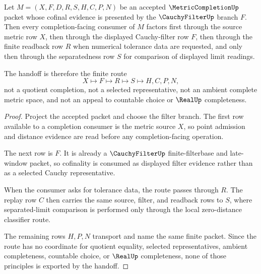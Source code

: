 \begin{theorem}
\label{thm:metric-completion-cauchy-filter-handoff}
Let $M=(X,F,D,R,S,H,C,P,N)$ be an accepted $\MetricCompletionUp$ packet whose cofinal evidence is presented by the $\CauchyFilterUp$ branch $F$. Then every completion-facing consumer of $M$ factors first through the source metric row $X$, then through the displayed Cauchy-filter row $F$, then through the finite readback row $R$ when numerical tolerance data are requested, and only then through the separatedness row $S$ for comparison of displayed limit readings.

The handoff is therefore the finite route
$$
X\longmapsto F\longmapsto R\longmapsto S\longmapsto H,C,P,N ,
$$
not a quotient completion, not a selected representative, not an ambient complete metric space, and not an appeal to countable choice or $\RealUp$ completeness.
\end{theorem}
\begin{proof}
Project the accepted packet and choose the filter branch. The first row available to a completion consumer is the metric source $X$, so point admission and distance evidence are read before any completion-facing operation.

The next row is $F$. It is already a $\CauchyFilterUp$ finite-filterbase and late-window packet, so cofinality is consumed as displayed filter evidence rather than as a selected Cauchy representative.

When the consumer asks for tolerance data, the route passes through $R$. The replay row $C$ then carries the same source, filter, and readback rows to $S$, where separated-limit comparison is performed only through the local zero-distance classifier route.

The remaining rows $H,P,N$ transport and name the same finite packet. Since the route has no coordinate for quotient equality, selected representatives, ambient completeness, countable choice, or $\RealUp$ completeness, none of those principles is exported by the handoff.
\end{proof}

